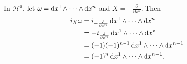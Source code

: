\begin{xmpl}
In $\mathcal{H}^n$, let
$\omega = \mathop{}\!\mathrm{d} x^1 \wedge \cdots \wedge \mathop{}\!\mathrm{d} x^n$ and
$X = -\frac{\partial}{\partial x^n}$. Then
\begin{align*}
   i_X \omega
&= i_{-\frac{\partial}{\partial x^n}}
     \dif x^1 \wedge \cdots \wedge \dif x^n \\
&= -i_{\frac{\partial}{\partial x^n}}
      \dif x^1 \wedge \cdots \wedge \dif x^n \\
&= (-1)(-1)^{n-1} \dif x^1 \wedge \cdots \wedge \dif x^{n-1} \\
&= (-1)^n \dif x^1 \wedge \cdots \wedge \dif x^{n-1}.
\end{align*}
\end{xmpl}
